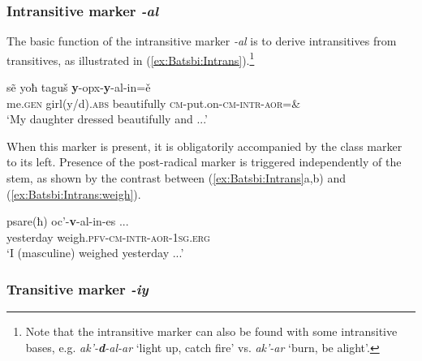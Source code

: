 \documentclass[output=paper]{langsci/langscibook}
\begin{document}
\subsubsection{Intransitive marker \textit{-al}}  

The basic function of the intransitive marker \textit{-al} is to  derive intransitives
from transitives, as illustrated in
(\ref{ex:Batsbi:Intrans}).\footnote{Note that the intransitive marker
  can also be found with some intransitive bases, e.g.
  \textit{ak’-\textbf{d}-al-ar} ‘light up, catch fire’ vs.
  \textit{ak’-ar} ‘burn, be alight’. %
}


\begin{exe}
  \ex \label{ex:Batsbi:Intrans}
  \begin{xlist}
    
    \ex \gll sẽ yoħ taguš \textbf{y}-opx-\textbf{y}-al-in=ě\\
    me.\textsc{gen} girl(y/d).\textsc{abs} beautifully \textsc{cm}-put.on-\textsc{cm-intr-aor}=\&\\
    \glt ‘My daughter dressed beautifully and ...’ \hfill\citep[275]{Harris09}
    
  \end{xlist}
    
\end{exe}

When this marker is present, it is obligatorily accompanied by the
class marker to its left. Presence of the post-radical marker is
triggered independently of the stem, as shown by the contrast between
(\ref{ex:Batsbi:Intrans}a,b) and (\ref{ex:Batsbi:Intrans:weigh}).

\begin{exe}
  \ex \gll psare(ħ) oc’-\textbf{v}-al-in-es ...\\
  yesterday weigh.\textsc{pfv-cm-intr-aor-1sg.erg}\\
  \glt ‘I (masculine) weighed yesterday ...’
  \hfill\citep[275]{Harris09} \label{ex:Batsbi:Intrans:weigh}

\end{exe}

\subsubsection{Transitive marker \textit{-iy}}
\end{document}
